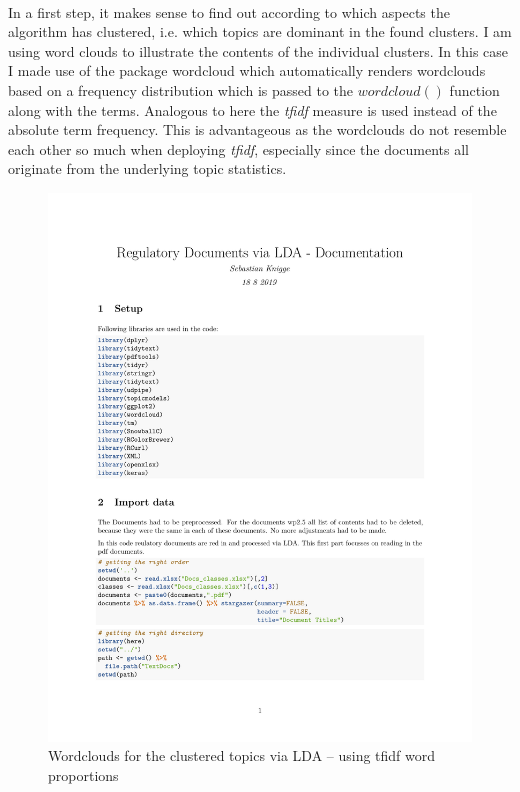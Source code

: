 \documentclass[11pt,a4paper]{article}
\begin{document}
\ \\
In a first step, it makes sense to find out according to which aspects the algorithm has clustered, i.e. which topics are dominant in the found clusters. I am using word clouds to illustrate the contents of the individual clusters. In this case I made use of the package wordcloud which automatically renders wordclouds based on a frequency distribution which is passed to the $wordcloud()$ function along with the terms. Analogous to \cite{Winter2017} here the \textit{tfidf} measure is used instead of the absolute term frequency. This is advantageous as the wordclouds do not resemble each other so much when deploying \textit{tfidf}, especially since the documents all originate from the underlying topic statistics.\\
\begin{figure}[h]
	\centering
	\includegraphics[page=9, trim=68 220 10 284,clip,width=1.2\textwidth]{Docs_LDA_adapted.pdf}
	\caption{Wordclouds for the clustered topics via LDA – using tfidf word proportions}
	\label{Wordclouds_tfidf}
\end{figure}
\end{document}
